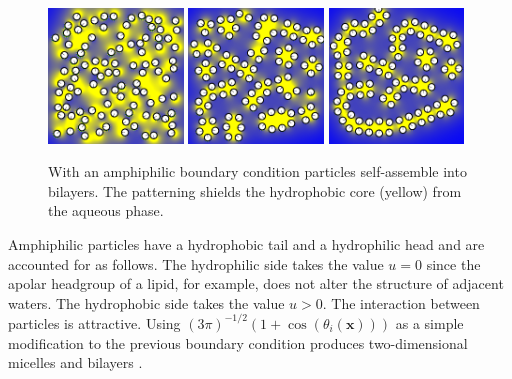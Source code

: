 \begin{figure}[h!]
\begin{center}  
    \includegraphics[width=0.32\textwidth]{figures/SpecificAim1/N100B1.pdf}
    \includegraphics[width=0.32\textwidth]{figures/SpecificAim1/N100B2.pdf}
    \includegraphics[width=0.32\textwidth]{figures/SpecificAim1/N100B3.pdf}\\
\end{center}    
\caption{With an amphiphilic boundary condition particles self-assemble
  into bilayers. The patterning shields the hydrophobic core (yellow) from the
  aqueous phase. 
      \label{fig:self-assemblyB}}
\end{figure}
Amphiphilic particles have a hydrophobic tail and a hydrophilic head
and are accounted for as follows.
The hydrophilic side takes the value $u = 0$ since the
apolar headgroup of a lipid, for example, does not alter the structure
of adjacent waters. The hydrophobic side takes the value $u > 0$. 
The interaction between particles is attractive. Using
$(3\pi )^{-1/2}(1 + \cos(\theta_i(\mathbf{x})))$
as a simple modification to the previous boundary condition 
produces two-dimensional micelles and bilayers \cite{Fu2018_SIAM}.
